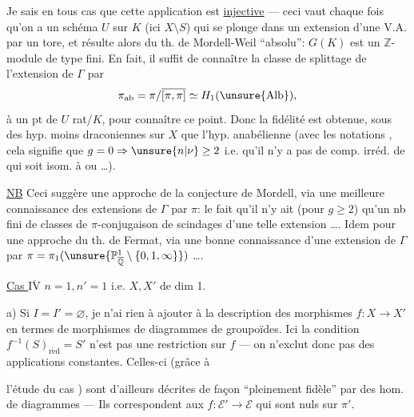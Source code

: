 Je sais en tous cas que cette application est \uline{injective} --- ceci vaut chaque fois qu'on a un schéma $U$ sur $K$ (ici $X\setminus S$) qui se plonge dans un  extension d'une V.A. par un tore, et résulte alors du th. de Mordell-Weil ``absolu'': $G(K)$ est un $\mathbb Z$-module de type fini.
En fait, il suffit de connaître la classe de splittage de l'extension  de $\Gamma$ par
\[
 \pi_{\mathrm{ab}}=\pi/\overline{[\pi,\pi]}\simeq H_1(\unsure{\mathrm{Alb}}),
\]
  à un pt de $U$ rat/$K$, pour connaître ce point. Donc la  fidélité est obtenue, sous des hyp. moins draconiennes sur $X$ que l'hyp. anabélienne (avec les notations  , cela signifie que $g=0\Rightarrow\unsure{n|\nu}\ge2$ i.e. qu'il n'y a pas de comp. irréd. de  qui soit isom. à  ou  \ldots).



\uline{NB} Ceci suggère une approche de la conjecture de Mordell, via une meilleure connaissance des extensions de $\Gamma$ par $\pi$: le fait qu'il n'y ait (pour $g\ge2$) qu'un nb fini de classes de $\pi$-conjugaison de scindages d'une telle extension \ldots.
Idem pour une approche du th. de Fermat, via  une bonne connaissance d'une extension de $\Gamma$ par $\pi=\pi_1(\unsure{\mathbb P^1_{\overline{\mathbb Q}}\setminus\{0,1,\infty\}})$ \ldots.

\uline{Cas $\overline{\mathrm{IV}}$} $n=1,n'=1$ i.e. $X,X'$ de dim 1.

a) Si $I=I'=\varnothing$, je n'ai rien à ajouter à la description des morphismes $f:X\to X'$ en termes de morphismes de diagrammes de groupoïdes. Ici  la condition $f^{-1}(S)_{\mathrm{r\acute ed}}=S'$ n'est pas une restriction sur $f$ ---  on n'exclut donc pas des applications constantes. Celles-ci (grâce à



l'étude du cas \uline{}) sont d'ailleurs décrites de façon ``pleinement fidèle'' par des hom. de diagrammes --- Ils correspondent aux  $f:\mathcal E'\to\mathcal E$ qui sont nuls sur $\pi'$.

